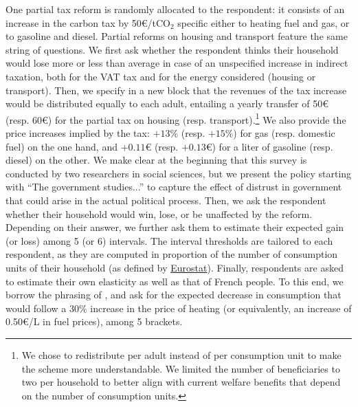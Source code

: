 \documentclass[11pt]{article}
\begin{document}
One partial tax reform is randomly allocated to the respondent: it consists of an increase in the carbon tax by 50\euro{}/t$\text{CO}_{2}$ specific either to heating fuel and gas, or to gasoline and diesel. Partial reforms on housing and transport feature the same string of questions. We first ask whether the respondent thinks their household would lose more or less than average in case of an unspecified increase in indirect taxation, both for the VAT tax and for the energy considered (housing or transport). Then, we specify in a new block that the revenues of the tax increase would be distributed equally to each adult, entailing a yearly transfer of 50\euro{} (resp. 60\euro{}) for the partial tax on housing (resp. transport).\footnote{We chose to redistribute per adult instead of per consumption unit to make the scheme more understandable. We limited the number of beneficiaries to two per household to better align with current welfare benefits that depend on the number of consumption units.} We also provide the price increases implied by the tax: $+13\%$ (resp. $+15\%$) for gas (resp. domestic fuel) on the one hand, and $+0.11$\euro{} (resp. $+0.13$\euro{}) for a liter of gasoline (resp. diesel) on the other. We make clear at the beginning that this survey is conducted by two researchers in social sciences, but we present the policy starting with ``The government studies...'' to capture the effect of distrust in government that could arise in the actual political process. Then, we ask the respondent whether their household would win, lose, or be unaffected by the reform. Depending on their answer, we further ask them to estimate their expected gain (or loss) among 5 (or 6) intervals. The interval thresholds are tailored to each respondent, as they are computed in proportion of the number of consumption units of their household (as defined by \href{http://ec.europa.eu/eurostat/statistics-explained/index.php/Glossary:Equivalised_disposable_income}{Eurostat}). Finally, respondents are asked to estimate their own elasticity as well as that of French people. To this end, we borrow the phrasing of \citet{baranzini_effectiveness_2017}, and ask for the expected decrease in consumption that would follow a 30\% increase in the price of heating (or equivalently, an increase of 0.50\euro{}/L in fuel prices), among 5 brackets.

\clearpage
\end{document}
